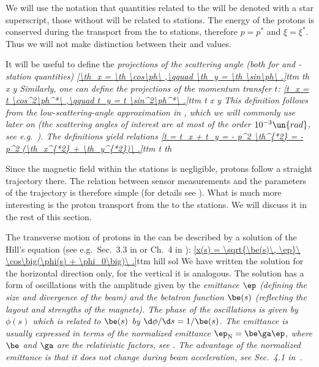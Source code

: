 We will use the notation that quantities related to the  will be denoted with a star superscript, those without will be related to  stations. The energy of the protons is conserved during the  transport from the  to  stations, therefore $p = p^*$ and $\xi = \xi^*$. Thus we will not make distinction between their  and  values.

It will be useful to define the \em{projections of the scattering angle} (both for  and -station quantities)
\eqref{\th_x = \th \cos\ph\ ,\qquad \th_y = \th \sin\ph\ .}{ttm th x y}
Similarly, one can define the projections of the momentum transfer $t$:
\eqref{t_x = t \cos^2\ph^*\ ,\qquad t_y = t \sin^2\ph^*\ .}{ttm t x y}
This definition follows from the low-scattering-angle approximation in , which we will commonly use later on (the scattering angles of interest are at most of the order $10^{-3}\un{rad}$, see e.g.~). The definitions  yield relations
\eqref{t = t_x + t_y = - p^2 \th^{*2} = - p^2 (\th_x^{*2} + \th_y^{*2})\ .}{ttm t th}

Since the magnetic field within the  stations is negligible, protons follow a straight trajectory there. The relation between  sensor measurements and the parameters of the trajectory is therefore simple (for details see ). What is much more interesting is the proton transport from the  to the  stations. We will discuss it in the rest of this section.

The transverse motion of protons in the  can be described by a solution of the Hill's equation (see e.g.~Sec.~3.3 in  or Ch.~4 in ):
\eqref{x(s) = \sqrt{\be(s)\, \ep}\ \cos\big(\phi(s) + \phi_0\big)\ .}{ttm hill sol}
We have written the solution for the horizontal direction only, for the vertical it is analogous. The solution has a form of oscillations with the amplitude given by the \em{emittance} $\ep$ (defining the size and divergence of the beam) and the \em{betatron function} $\be(s)$ (reflecting the layout and strengths of the  magnets). The \em{phase} of the oscillations is given by $\phi(s)$ which is related to $\be(s)$ by $\d\phi/\d s = 1/\be(s)$. The emittance is usually expressed in terms of the \em{normalized emittance} $\ep_{\rm N} = \be\ga \ep$, where $\be$ and $\ga$ are the relativistic factors, see . The advantage of the normalized emittance is that it does not change during beam acceleration, see Sec.~4.1 in~.

